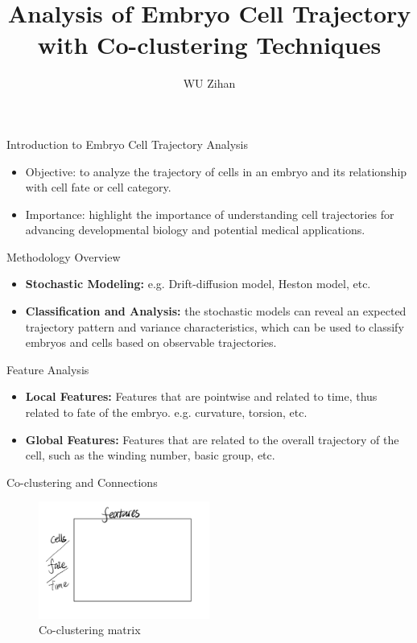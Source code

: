 \documentclass{beamer}
\title{Analysis of Embryo Cell Trajectory with Co-clustering Techniques}
\author{WU Zihan}
\begin{document}
\maketitle
\begin{frame}{Introduction to Embryo Cell Trajectory Analysis}
  \begin{itemize}
    \item Objective: to analyze the trajectory of cells in an embryo and its relationship with cell fate or cell category.
    \item Importance: highlight the importance of understanding cell trajectories for advancing developmental biology and potential medical applications.
  \end{itemize}
\end{frame}

\begin{frame}{Methodology Overview}
  \begin{itemize}
    \item \textbf{Stochastic Modeling:} 
    e.g. Drift-diffusion model, Heston model, etc.
    \item \textbf{Classification and Analysis:} the stochastic models can reveal an expected trajectory pattern and variance characteristics, which can be used to classify embryos and cells based on observable trajectories.
  \end{itemize}
\end{frame}

\begin{frame}{Feature Analysis}
  \begin{itemize}
    \item \textbf{Local Features:} Features that are pointwise and related to time, thus related to fate of the embryo. e.g. curvature, torsion, etc.
    \item \textbf{Global Features:} Features that are related to the overall trajectory of the cell, such as the winding number, basic group, etc.
  \end{itemize}
\end{frame}

\begin{frame}{Co-clustering and Connections}
  \begin{figure}
    \centering
    \includegraphics[width=0.5\textwidth]{matrix.jpeg}
    \caption{Co-clustering matrix}
  \end{figure}
\end{frame}
\end{document}
